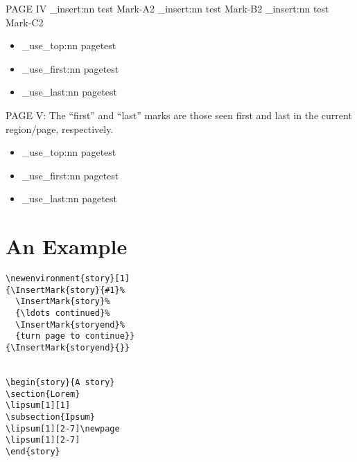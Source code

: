 \documentclass{article}
\begin{document}
\newpage
PAGE IV
\ExplSyntaxOn
\mark_insert:nn {test} {Mark-A2}
\mark_insert:nn {test} {Mark-B2}
\mark_insert:nn {test} {Mark-C2}

\begin{itemize}
  \item \mark_use_top:nn {page}{test} 
  \item \mark_use_first:nn {page}{test}
  \item \mark_use_last:nn {page}{test}
\end{itemize}
\ExplSyntaxOff


\newpage
PAGE V: The ``first'' and ``last'' marks are those seen first and last in the current region/page, respectively.
\ExplSyntaxOn
\begin{itemize}
  \item \mark_use_top:nn {page}{test} 
  \item \mark_use_first:nn {page}{test}
  \item \mark_use_last:nn {page}{test}
\end{itemize}
\ExplSyntaxOff


\section{An Example}
\begin{verbatim}
\newenvironment{story}[1]
{\InsertMark{story}{#1}%
  \InsertMark{story}%
  {\ldots continued}%
  \InsertMark{storyend}%
  {turn page to continue}}
{\InsertMark{storyend}{}}


\begin{story}{A story}
\section{Lorem}
\lipsum[1][1]
\subsection{Ipsum} 
\lipsum[1][2-7]\newpage
\lipsum[1][2-7]
\end{story}
\end{verbatim}
\end{document}
